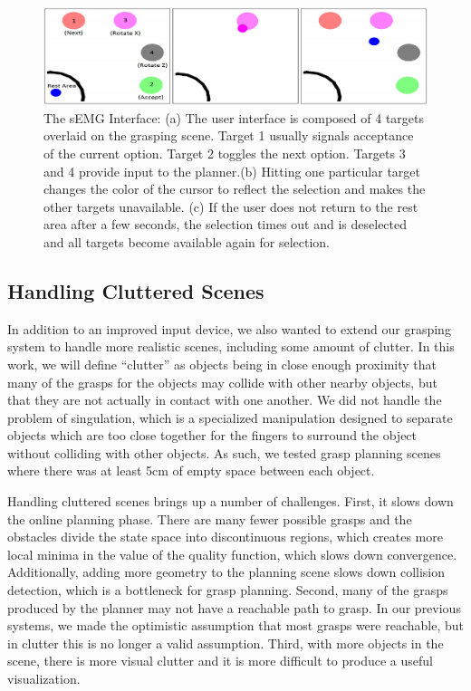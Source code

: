 \begin{figure}
\centering
\includegraphics[width=.99\textwidth]{semg_interface_blank.png}
\caption{The sEMG Interface: (a) The user interface is composed of 4 targets overlaid on the grasping scene. Target 1 usually signals acceptance of the current option. Target 2 toggles the next option. Targets 3 and 4 provide input to the planner.(b) Hitting one particular target changes the color of the cursor to reflect the selection and makes the other targets unavailable. (c) If the user does not return to the rest area after a few seconds, the selection times out and is deselected and all targets become available again for selection. }
\label{fig:semg_ui_blank}
\end{figure}


\subsection{Handling Cluttered Scenes}
In addition to an improved input device, we also wanted to extend our grasping system to handle more realistic scenes, including some amount of clutter. In this work, we will define ``clutter'' as objects being in close enough proximity that many of the grasps for the objects may collide with other nearby objects, but that they are not actually in contact with one another. We did not handle the problem of singulation, which is a specialized manipulation designed to separate objects which are too close together for the fingers to surround the object without colliding with other objects. As such, we tested grasp planning scenes where there was at least 5cm of empty space between each object. 

Handling cluttered scenes brings up a number of challenges. First, it slows down the online planning phase. There are many fewer possible grasps and the obstacles divide the state space into discontinuous regions, which creates more local minima in the value of the quality function, which slows down convergence. Additionally, adding more geometry to the planning scene slows down collision detection, which is a bottleneck for grasp planning. Second, many of the grasps produced by the planner may not have a reachable path to grasp. In our previous systems, we made the optimistic assumption that most grasps were reachable, but in clutter this is no longer a valid assumption. Third, with more objects in the scene, there is more visual clutter and it is more difficult to produce a useful visualization.

